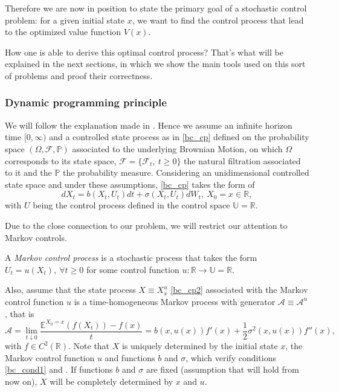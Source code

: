 Therefore we are now in position to state the primary goal of a stochastic control problem: for a given initial state $x$, we want to find the control process that lead to the optimized value function $V(x)$.

How one is able to derive this optimal control process? That's what will be explained in the next sections, in which we show the main tools used on this sort of problems and proof their correctness.

\subsubsection{Dynamic programming principle}

We will follow the explanation made in \cite{ross}. Hence we assume an infinite horizon time $[0,\infty)$ and a controlled state process as in \eqref{bc_cp} defined on the probability space $(\Omega,\mathcal{F}, \mathds{P})$ associated to the underlying Brownian Motion, on which $\Omega$ corresponds to its state space, $\mathcal{F}=\{\mathcal{F}_t, \ t\geq0 \}$ the natural filtration associated to it and the $\mathds{P}$ the probability measure. Considering an unidimensional controlled state space and under these assumptions, \eqref{bc_cp} takes the form of
\begin{equation}
 	d X_t=b(X_t,U_t)dt + \sigma (X_t,U_t)dW_t, \ X_0=x\in \mathds{R},
 \label{bc_cp2}
\end{equation} 
with $U$ being the control process defined in the control space $\mathds{U}=\mathds{R}$.

Due to the close connection to our problem, we will restrict our attention to Markov controls.
\begin{defi}
	A \textit{Markov control process} is a stochastic process that takes the
	form $U_t=u(X_t), \ \forall t \geq 0$ for some control function $u: \mathds{R} \rightarrow \mathds{U}=\mathds{R}$.
\end{defi}

Also, assume that the state process $X \equiv X_x^u$ \eqref{bc_cp2} associated with the Markov control function $u$ is a time-homogeneous Markov process with generator $\mathcal{A} \equiv \mathcal{A}^u$, that is
$$\mathcal{A}=\lim_{t\downarrow 0} \frac{\mathds{E}^{X_0=x}(f(X_t))-f(x)}{t}=b(x,u(x)) f'(x)+\frac{1}{2}\sigma^2(x,u(x))f''(x),$$
with $f \in C^2(\mathds{R})$. Note that $X$ is uniquely determined by the initial state $x$, the Markov control function $u$ and functions $b$ and $\sigma$, which verify conditions \eqref{bc_cond1} and . If functions $b$ and $\sigma$ are fixed (assumption that will hold from now on), $X$ will be completely determined by $x$ and $u$.


